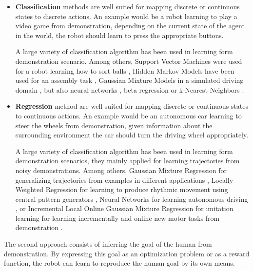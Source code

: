 \begin{itemize}

\item \textbf{Classification} methods are well suited for mapping discrete or continuous states to discrete actions. An example would be a robot learning to play a video game from demonstration, depending on the current state of the agent in the world, the robot should learn to press the appropriate buttons.

A large variety of classification algorithm has been used in learning form demonstration scenario. Among others, Support Vector Machines were used for a robot learning how to sort balls \cite{chernova2008teaching}, Hidden Markov Models have been used for an assembly task \cite{hovland1996skill}, Gaussian Mixture Models in a simulated driving domain \cite{chernova09jair}, but also neural networks \cite{mataric2000sensory}, beta regression \cite{montesano2009learning} or k-Nearest Neighbors \cite{saunders2006teaching}.

\item \textbf{Regression} method are well suited for mapping discrete or continuous states to continuous actions. An example would be an autonomous car learning to steer the wheels from demonstration, given information about the surrounding environment the car should turn the driving wheel appropriately.

A large variety of classification algorithm has been used in learning form demonstration scenarios, they mainly applied for learning trajectories from noisy demonstrations. Among others, Gaussian Mixture Regression for generalizing trajectories from examples in different applications \cite{calinon07}, Locally Weighted Regression for learning to produce rhythmic movement using central pattern generators \cite{schaal1998programmable,ijspeert2002learning}, Neural Networks for learning autonomous driving \cite{pomerleau1991efficient}, or Incremental Local Online Gaussian Mixture Regression for imitation learning for learning incrementally and online new motor tasks from demonstration \cite{cederborg2010incremental}.

\end{itemize}

The second approach consists of inferring the goal of the human from demonstration. By expressing this goal as an optimization problem or as a reward function, the robot can learn to reproduce the human goal by its own means.

